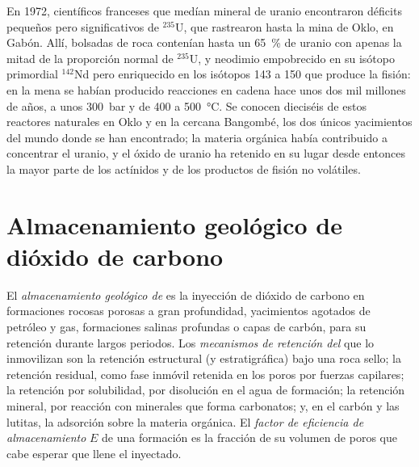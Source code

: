 \begin{history}
En 1972, científicos franceses que medían mineral de uranio encontraron déficits pequeños pero significativos de
$^{235}$U, que rastrearon hasta la mina de Oklo, en Gabón. Allí, bolsadas de roca contenían hasta un
\qty{65}{\percent} de uranio con apenas la mitad de la proporción normal de $^{235}$U, y neodimio
empobrecido en su isótopo primordial $^{142}$Nd pero enriquecido en los isótopos 143 a 150 que produce la fisión:
en la mena se habían producido reacciones en cadena hace unos dos mil millones de años, a unos \qty{300}{bar}
y de 400 a \qty{500}{\celsius}. Se conocen dieciséis de estos reactores naturales en Oklo y en la cercana
Bangombé, los dos únicos yacimientos del mundo donde se han encontrado; la materia orgánica había contribuido a
concentrar el uranio, y el óxido de uranio ha retenido en su lugar desde entonces la mayor parte de los actínidos y de los
productos de fisión no volátiles.
\end{history}

\section{Almacenamiento geológico de dióxido de carbono}\label{sec:b2:energy-geology:ccs}

\begin{definition}\label{def:b2:energy-geology:ccs}
El \emph{almacenamiento geológico de } es la inyección de dióxido
de carbono en formaciones rocosas porosas a gran profundidad, yacimientos agotados de petróleo y gas, formaciones salinas
profundas o capas de carbón, para su retención durante largos periodos. Los \emph{mecanismos de retención
del } que lo inmovilizan son la retención estructural (y estratigráfica)
bajo una roca sello; la retención residual, como fase inmóvil retenida en los poros por fuerzas
capilares; la retención por solubilidad, por disolución en el agua de formación; la retención mineral, por reacción
con minerales que forma carbonatos; y, en el carbón y las lutitas, la adsorción sobre la materia orgánica. El \emph{factor de eficiencia de almacenamiento}
$E$ de una formación es la fracción de su volumen de poros que cabe esperar que llene el
 inyectado.
\end{definition}

